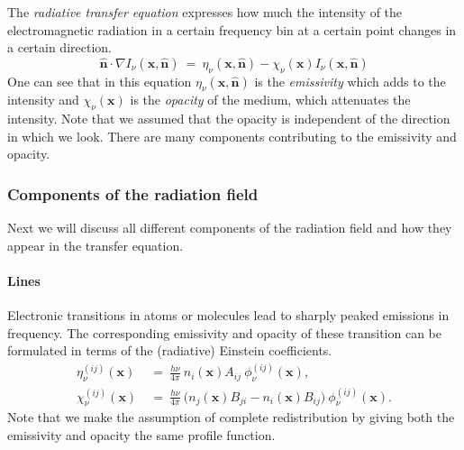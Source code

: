 \documentclass[]{article}
\begin{document}
\bigskip

The \emph{radiative transfer equation} expresses how much the intensity of the electromagnetic radiation in a certain frequency bin at a certain point changes in a certain direction.
\begin{equation}
\hat{\textbf{n}} \cdot \nabla I_{\nu}(\textbf{x},\hat{\textbf{n}}) \ = \ \eta_{\nu}(\textbf{x},\hat{\textbf{n}}) - \chi_{\nu}(\textbf{x}) I_{\nu}(\textbf{x},\hat{\textbf{n}})
\end{equation}
One can see that in this equation $\eta_{\nu}(\textbf{x},\hat{\textbf{n}})$ is the \emph{emissivity} which adds to the intensity and $\chi_{\nu}(\textbf{x})$ is the \emph{opacity} of the medium, which attenuates the intensity. Note that we assumed that the opacity is independent of the direction in which we look. There are many components contributing to the emissivity and opacity.



\subsubsection{Components of the radiation field}
Next we will discuss all different components of the radiation field and how they appear in the transfer equation.

\paragraph{Lines} Electronic transitions in atoms or molecules lead to sharply peaked emissions in frequency. The corresponding emissivity and opacity of these transition can be formulated in terms of the (radiative) Einstein coefficients.
\begin{equation}
\begin{split}
\eta^{(ij)}_{\nu}(\textbf{x}) \ &= \ \frac{h \nu}{4 \pi} \ n_{i}(\textbf{x}) A_{ij} \ \phi^{(ij)}_{\nu}(\textbf{x}), \\
\chi^{(ij)}_{\nu}(\textbf{x}) \ &= \ \frac{h \nu}{4 \pi} \ \big( n_{j}(\textbf{x}) B_{ji} - n_{i}(\textbf{x}) B_{ij} \big) \ \phi^{(ij)}_{\nu}(\textbf{x}).
\end{split}
\end{equation}
Note that we make the assumption of complete redistribution by giving both the emissivity and opacity the same profile function.
\end{document}
